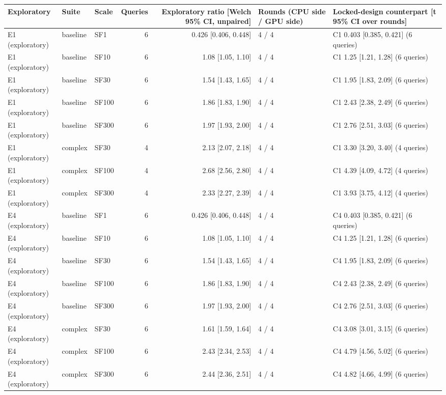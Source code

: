 \begin{longtable}{lllrrll}
\toprule
Exploratory & Suite & Scale & Queries & Exploratory ratio [Welch 95\% CI, unpaired] & Rounds (CPU side / GPU side) & Locked-design counterpart [t 95\% CI over rounds] \\
\midrule
\endhead
\bottomrule
\endfoot
E1 (exploratory) & baseline & SF1 & 6 & 0.426 [0.406, 0.448] & 4 / 4 & C1 0.403 [0.385, 0.421] (6 queries) \\
E1 (exploratory) & baseline & SF10 & 6 & 1.08 [1.05, 1.10] & 4 / 4 & C1 1.25 [1.21, 1.28] (6 queries) \\
E1 (exploratory) & baseline & SF30 & 6 & 1.54 [1.43, 1.65] & 4 / 4 & C1 1.95 [1.83, 2.09] (6 queries) \\
E1 (exploratory) & baseline & SF100 & 6 & 1.86 [1.83, 1.90] & 4 / 4 & C1 2.43 [2.38, 2.49] (6 queries) \\
E1 (exploratory) & baseline & SF300 & 6 & 1.97 [1.93, 2.00] & 4 / 4 & C1 2.76 [2.51, 3.03] (6 queries) \\
E1 (exploratory) & complex & SF30 & 4 & 2.13 [2.07, 2.18] & 4 / 4 & C1 3.30 [3.20, 3.40] (4 queries) \\
E1 (exploratory) & complex & SF100 & 4 & 2.68 [2.56, 2.80] & 4 / 4 & C1 4.39 [4.09, 4.72] (4 queries) \\
E1 (exploratory) & complex & SF300 & 4 & 2.33 [2.27, 2.39] & 4 / 4 & C1 3.93 [3.75, 4.12] (4 queries) \\
E4 (exploratory) & baseline & SF1 & 6 & 0.426 [0.406, 0.448] & 4 / 4 & C4 0.403 [0.385, 0.421] (6 queries) \\
E4 (exploratory) & baseline & SF10 & 6 & 1.08 [1.05, 1.10] & 4 / 4 & C4 1.25 [1.21, 1.28] (6 queries) \\
E4 (exploratory) & baseline & SF30 & 6 & 1.54 [1.43, 1.65] & 4 / 4 & C4 1.95 [1.83, 2.09] (6 queries) \\
E4 (exploratory) & baseline & SF100 & 6 & 1.86 [1.83, 1.90] & 4 / 4 & C4 2.43 [2.38, 2.49] (6 queries) \\
E4 (exploratory) & baseline & SF300 & 6 & 1.97 [1.93, 2.00] & 4 / 4 & C4 2.76 [2.51, 3.03] (6 queries) \\
E4 (exploratory) & complex & SF30 & 6 & 1.61 [1.59, 1.64] & 4 / 4 & C4 3.08 [3.01, 3.15] (6 queries) \\
E4 (exploratory) & complex & SF100 & 6 & 2.43 [2.34, 2.53] & 4 / 4 & C4 4.79 [4.56, 5.02] (6 queries) \\
E4 (exploratory) & complex & SF300 & 6 & 2.44 [2.36, 2.51] & 4 / 4 & C4 4.82 [4.66, 4.99] (6 queries) \\
\end{longtable}
